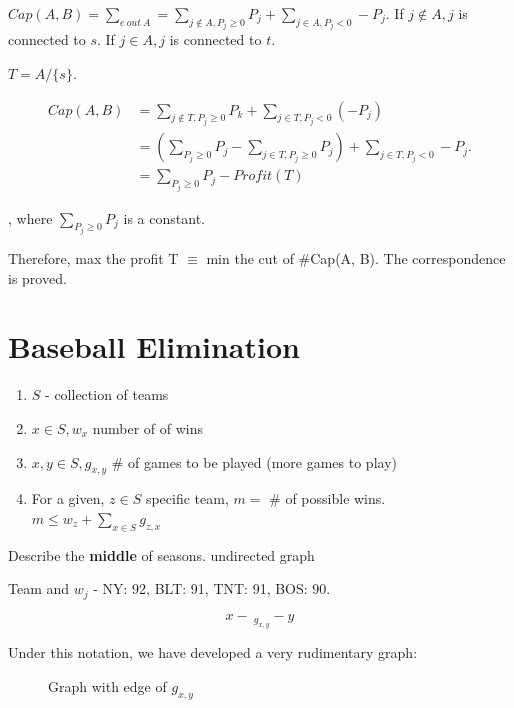 \documentclass[a4paper]{report}
\theoremstyle{definition}
\begin{document}
$Cap(A, B)=\sum_{e~out~A} = \sum_{j \notin A, P_j\geq 0}P_j+\sum_{j \in A, P_j<0}-P_j$. If $j \notin A, j$ is connected to $s$. If $j \in A, j$ is connected to $t$.

$T=A/\{s\}$.

\begin{align*}
Cap(A, B)&=\sum_{j\notin T, P_j\geq 0}P_k+\sum_{j\in T, P_j <0}(-P_j) \\
&= (\sum_{P_j\geq 0}P_j-\sum_{j \in T, P_j\geq 0}P_j)+\sum_{j\in T, P_j <0}-P_j.\\
&=  \sum_{P_j\geq 0}P_j - Profit(T)
\end{align*}

, where $\sum_{P_j\geq 0}P_j$ is a constant.

Therefore, max the profit T $\equiv$ min the cut of #Cap(A, B). The correspondence is proved.


\section{Baseball Elimination}
\begin{enumerate}
\item $S$ - collection of teams
\item $x\in S, w_x$ number of of wins
\item $x, y \in S, g_{x, y}$  \# of games to be played (more games to play)
\item For a given, $z\in S$ specific team, $m=$ \# of possible wins. $m \leq w_z+\sum_{x\in S} g_{z,x}$
\end{enumerate}

Describe the \textbf{middle} of seasons. undirected graph

Team and $w_j$ - NY: 92, BLT: 91, TNT: 91, BOS: 90.

$$x -\ _{g_{x, y}} - y$$


Under this notation, we have developed a very rudimentary graph:
\begin{figure}[!htp]
\centering
{}
\caption{Graph with edge of $g_{x,y}$}
\label{fig:baseball0}
\end{figure}
\end{document}
